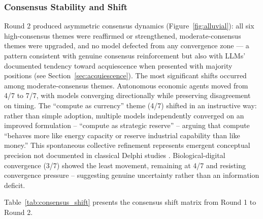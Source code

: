 \documentclass[preprint,review,12pt]{elsarticle}
\begin{document}
\subsubsection{Consensus Stability and Shift}
\label{sec:consensus_stability}

Round 2 produced asymmetric consensus dynamics (Figure~\ref{fig:alluvial}): all six high-consensus themes were reaffirmed or strengthened, moderate-consensus themes were upgraded, and no model defected from any convergence zone --- a pattern consistent with genuine consensus reinforcement but also with LLMs' documented tendency toward acquiescence when presented with majority positions (see Section~\ref{sec:acquiescence}). The most significant shifts occurred among moderate-consensus themes. Autonomous economic agents moved from 4/7 to 7/7, with models converging directionally while preserving disagreement on timing. The ``compute as currency'' theme (4/7) shifted in an instructive way: rather than simple adoption, multiple models independently converged on an improved formulation -- ``compute as strategic reserve'' -- arguing that compute ``behaves more like energy capacity or reserve industrial capability than like money.'' This spontaneous collective refinement represents emergent conceptual precision not documented in classical Delphi studies \citep{vondergracht2012delphi}. Biological-digital convergence (3/7) showed the least movement, remaining at 4/7 and resisting convergence pressure -- suggesting genuine uncertainty rather than an information deficit.

Table~\ref{tab:consensus_shift} presents the consensus shift matrix from Round 1 to Round 2.
\end{document}
